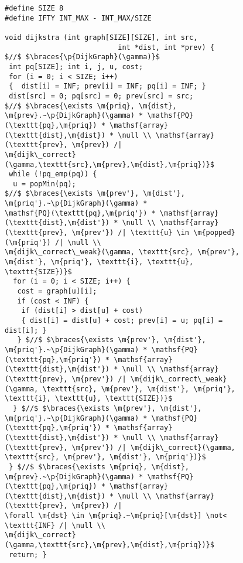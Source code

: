 
\begin{figure}
\begin{lstlisting}[mathescape=true,showlines=true]
#define SIZE 8
#define IFTY INT_MAX - INT_MAX/SIZE

void dijkstra (int graph[SIZE][SIZE], int src, 
                           int *dist, int *prev) {
$//$ $\braces{\p{DijkGraph}(\gamma)}$
 int pq[SIZE]; int i, j, u, cost;
 for (i = 0; i < SIZE; i++) 
 {  dist[i] = INF; prev[i] = INF; pq[i] = INF; }
 dist[src] = 0; pq[src] = 0; prev[src] = src;
$//$ $\braces{\exists \m{priq}, \m{dist}, \m{prev}.~\p{DijkGraph}(\gamma) * \mathsf{PQ}(\texttt{pq},\m{priq}) * \mathsf{array}(\texttt{dist},\m{dist}) * \null \\ \mathsf{array}(\texttt{prev}, \m{prev}) /|
\m{dijk\_correct}(\gamma,\texttt{src},\m{prev},\m{dist},\m{priq})}$
 while (!pq_emp(pq)) {
  u = popMin(pq);
$//$ $\braces{\exists \m{prev'}, \m{dist'}, \m{priq'}.~\p{DijkGraph}(\gamma) *
\mathsf{PQ}(\texttt{pq},\m{priq'}) * \mathsf{array}(\texttt{dist},\m{dist'}) * \null \\ \mathsf{array}(\texttt{prev}, \m{prev'}) /| \texttt{u} \in \m{popped}(\m{priq'}) /| \null \\
\m{dijk\_correct\_weak}(\gamma, \texttt{src}, \m{prev'}, \m{dist'}, \m{priq'}, \texttt{i}, \texttt{u}, \texttt{SIZE})}$
  for (i = 0; i < SIZE; i++) {
   cost = graph[u][i]; 
   if (cost < INF) {
    if (dist[i] > dist[u] + cost)
    { dist[i] = dist[u] + cost; prev[i] = u; pq[i] = dist[i]; }
   } $//$ $\braces{\exists \m{prev'}, \m{dist'}, \m{priq'}.~\p{DijkGraph}(\gamma) * \mathsf{PQ}(\texttt{pq},\m{priq'}) * \mathsf{array}(\texttt{dist},\m{dist'}) * \null \\ \mathsf{array}(\texttt{prev}, \m{prev'}) /| \m{dijk\_correct\_weak}(\gamma, \texttt{src}, \m{prev'}, \m{dist'}, \m{priq'}, \texttt{i}, \texttt{u}, \texttt{SIZE})}$  
  } $//$ $\braces{\exists \m{prev'}, \m{dist'}, \m{priq'}.~\p{DijkGraph}(\gamma) * \mathsf{PQ}(\texttt{pq},\m{priq'}) * \mathsf{array}(\texttt{dist},\m{dist'}) * \null \\ \mathsf{array}(\texttt{prev}, \m{prev'}) /| \m{dijk\_correct}(\gamma, \texttt{src}, \m{prev'}, \m{dist'}, \m{priq'})}$
 } $//$ $\braces{\exists \m{priq}, \m{dist}, \m{prev}.~\p{DijkGraph}(\gamma) * \mathsf{PQ}(\texttt{pq},\m{priq}) * \mathsf{array}(\texttt{dist},\m{dist}) * \null \\ \mathsf{array}(\texttt{prev}, \m{prev}) /| 
\forall \m{dst} \in \m{priq}.~\m{priq}[\m{dst}] \not< \texttt{INF} /| \null \\
\m{dijk\_correct}(\gamma,\texttt{src},\m{prev},\m{dist},\m{priq})}$
 return; }
\end{lstlisting}
\end{figure}